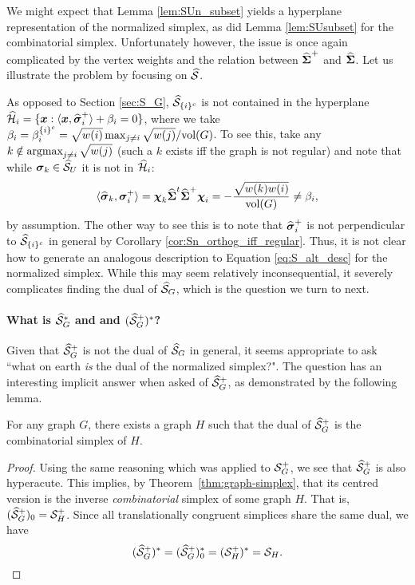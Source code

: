 We might expect that Lemma \ref{lem:SUn_subset} yields a hyperplane representation of the normalized simplex, as did Lemma \ref{lem:SUsubset} for the combinatorial simplex. Unfortunately however, the issue is once again complicated by the vertex weights and the relation between $\widehat{\boldsymbol{\Sigma}}^+$ and $\widehat{\boldsymbol{\Sigma}}$. Let us illustrate the problem by focusing on $\widehat{\mathcal{S}}$. 

As opposed to Section \ref{sec:S_G}, $\widehat{\mathcal{S}}_{\{i\}^c} $ is not contained in the hyperplane $\widehat{\mathcal{H}}_i = \{\vb*{x}: \langle \vb*{x},\widehat{\vb*{\sigma}}_i^+\rangle + \beta_i=0\}$, where we take $\beta_i = \beta_i^{\{i\}^c} = \sqrt{w(i)}\max_{j\neq i}\sqrt{w(j)} / \textnormal{vol}(G)$. To see this, take any $k\notin \operatorname*{\textnormal{argmax}}_{j\neq i} \sqrt{w(j)}$ (such a $k$ exists iff the graph is not regular) and note that while $\vb*{\sigma}_k\in\widehat{\mathcal{S}}_U$ it is not in $\widehat{\mathcal{H}}_i$: 
\[\langle \widehat{\vb*{\sigma}}_k,\vb*{\sigma}_i^+\rangle = \boldsymbol{\chi}_k\widehat{\boldsymbol{\Sigma}}^t\widehat{\boldsymbol{\Sigma}}^+\boldsymbol{\chi}_i = -\frac{\sqrt{w(k)w(i)}}{\textnormal{vol}(G)}\neq \beta_i,\]
by assumption. The other way to see this is to note that $\widehat{\vb*{\sigma}}_i^+$ is not perpendicular to $\widehat{\mathcal{S}}_{\{i\}^c}$ in general by Corollary \ref{cor:Sn_orthog_iff_regular}. Thus, it is not  clear how to generate an analogous description to Equation \eqref{eq:S_alt_desc} for the normalized simplex. While this may seem relatively inconsequential, it severely complicates finding the dual of $\widehat{\mathcal{S}}_G$, which is the question we turn to next. 

\paragraph{What is $\widehat{\mathcal{S}}_G^*$ and and $(\widehat{\mathcal{S}}_G^+)^*$?} 
Given that $\widehat{\mathcal{S}}_G^+$ is not the dual of $\widehat{\mathcal{S}}_G$ in general, it  seems appropriate  to  ask ``what on  earth \emph{is} the dual of the normalized simplex?". The question has an interesting  implicit answer when asked of  $\widehat{\mathcal{S}}_G^+$, as demonstrated by  the following  lemma. 

\begin{lemma}
	For any graph $G$, there  exists a graph $H$ such that the  dual  of $\widehat{\mathcal{S}}_G^+$ is the combinatorial  simplex of $H$.  
\end{lemma} 
\begin{proof}
Using the same reasoning which was applied to $\mathcal{S}_G^+$, we see that $\widehat{\mathcal{S}}_G^+$  is also hyperacute.
This implies, by Theorem~\ref{thm:graph-simplex}, that its centred version is the inverse \emph{combinatorial} simplex of some graph $H$. That is,  $(\widehat{\mathcal{S}}_G^+)_0 = \mathcal{S}_H^+$. Since all translationally congruent simplices  share the same dual, we have 
\begin{equation*}
(\widehat{\mathcal{S}}_G^+)^* = (\widehat{\mathcal{S}}_G^+)^*_0 = (\mathcal{S}_H^+)^* = \mathcal{S}_H.\qedhere
\end{equation*}
\end{proof}

